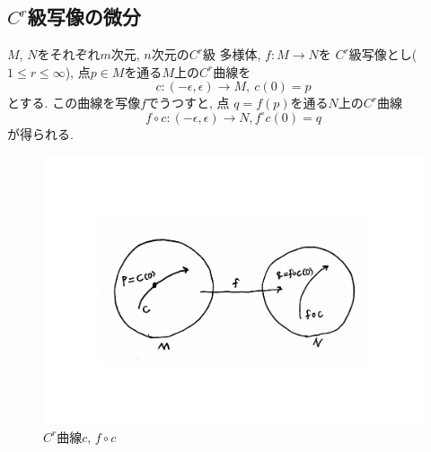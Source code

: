 \documentclass[a4j,12pt]{jarticle}
\theoremstyle{definition}
\begin{document}
\subsection{$C^r$級写像の微分}
$M$, $N$をそれぞれ$m$次元, $n$次元の$C^r$級
多様体, $f:M\to N$を
$C^r$級写像とし($1 \leq r\leq \infty$), 
点$p\in M$を通る$M$上の$C^r$曲線を
$$c:(-\epsilon, \epsilon)\to M,\ c(0)=p$$
とする. この曲線を写像$f$でうつすと, 点
$q=f(p)$を通る$N$上の$C^r$曲線
$$f\circ c:(-\epsilon, \epsilon)\to N, f^\circ c(0)=q$$
が得られる. 
\begin{figure}[H]
    \centering
    \includegraphics[keepaspectratio, scale=0.4]{cTofc.pdf}
    \caption{$C^r$曲線$c$, $f\circ c$}
    \label{cTofc}
   \end{figure}
   
\end{document}
